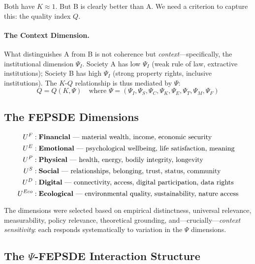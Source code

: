 Both have $K \approx 1$. But B is clearly better than A.
We need a criterion to capture this: the quality index $Q$.

\paragraph{The Context Dimension.}
What distinguishes A from B is not coherence but \emph{context}---specifically,
the institutional dimension $\Psi_I$. Society A has low $\Psi_I$ (weak rule of law,
extractive institutions); Society B has high $\Psi_I$ (strong property rights,
inclusive institutions). The $K$-$Q$ relationship is thus mediated by $\Psi$:
\begin{equation}
  Q = Q(K, \Psi) \quad \text{where } \Psi = (\Psi_I, \Psi_S, \Psi_C, \Psi_K, \Psi_E, \Psi_T, \Psi_M, \Psi_F)
  \label{eq:Q-K-Psi}
\end{equation}

\subsection{The FEPSDE Dimensions}

\begin{definition}
\label{def:fepsde}
\begin{align*}
  U^F &: \text{\textbf{Financial} --- material wealth, income, economic security} \\
  U^E &: \text{\textbf{Emotional} --- psychological wellbeing, life satisfaction, meaning} \\
  U^P &: \text{\textbf{Physical} --- health, energy, bodily integrity, longevity} \\
  U^S &: \text{\textbf{Social} --- relationships, belonging, trust, status, community} \\
  U^D &: \text{\textbf{Digital} --- connectivity, access, digital participation, data rights} \\
  U^{Eco} &: \text{\textbf{Ecological} --- environmental quality, sustainability, nature access}
\end{align*}
\end{definition}

The dimensions were selected based on empirical distinctness, universal relevance,
measurability, policy relevance, theoretical grounding, and---crucially---\emph{context sensitivity}:
each responds systematically to variation in the $\Psi$ dimensions.

\subsection{The $\Psi$-FEPSDE Interaction Structure}

